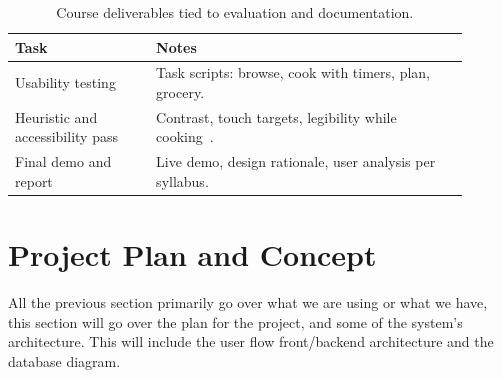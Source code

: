 \documentclass[conference]{IEEEtran}
\begin{document}
\begin{table}[!htbp]
\centering
\caption{Course deliverables tied to evaluation and documentation.}
\label{tab:course}
\begin{tabular}{|@{}>{\raggedright\arraybackslash}p{0.28\linewidth}|>{\raggedright\arraybackslash}p{0.62\linewidth}@{}|}
\hline
\textbf{Task} & \textbf{Notes} \\
\hline
Usability testing & Task scripts: browse, cook with timers, plan, grocery. \\\hline
Heuristic and accessibility pass & Contrast, touch targets, legibility while cooking~\cite{wcag21}. \\\hline
Final demo and report & Live demo, design rationale, user analysis per syllabus. \\\hline
\end{tabular}
\end{table}

\section{Project Plan and Concept}
All the previous section primarily go over what we are using or what we have, this section will go over the plan for the project, and some of the system's architecture. This will include the user flow front/backend architecture and the database diagram.
\end{document}
